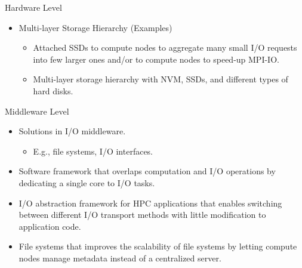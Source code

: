 \documentclass[compress,11pt,xcolor=svgnames,aspectratio=169]{beamer}
\begin{document}
\begin{frame}[t]{Hardware Level}

\begin{itemize}

      \item Multi-layer Storage Hierarchy (Examples)\\[0.4cm]

        \begin{itemize}
        \setlength\itemsep{0.6cm}

        \item Attached SSDs to compute nodes to aggregate many small I/O requests into few larger ones and/or to compute nodes to speed-up MPI-IO.

        \item Multi-layer storage hierarchy with NVM, SSDs, and different types of hard disks. %


        \end{itemize}

\end{itemize}

\nocite{3372390}

\end{frame}

\begin{frame}[t]{Middleware Level}

\begin{itemize}
\setlength\itemsep{0.4cm}

\item Solutions in I/O middleware.

    \begin{itemize}

    \item E.g., file systems, I/O interfaces.

    \end{itemize}

\item Software framework that overlaps computation and I/O operations by dedicating a single core to I/O tasks.

\item I/O abstraction framework for HPC applications that enables switching between different I/O transport methods with little modification to application code.

\item File systems that improves the scalability of file systems by letting compute nodes manage metadata instead of a centralized server.

\end{itemize}

\nocite{3372390}

\end{frame}
\end{document}
